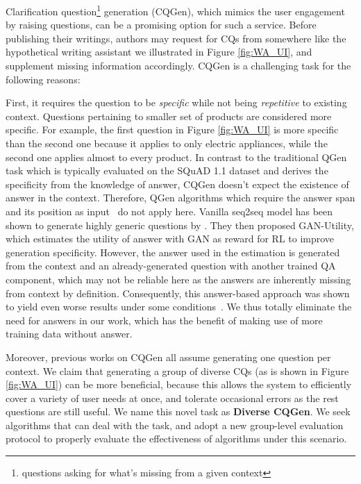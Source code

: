 Clarification question\footnote{questions asking for what's missing from a given context} generation (CQGen), which mimics the user engagement by raising questions, can be a promising option for such a service. Before publishing their writings, authors may request for CQs from somewhere like the hypothetical writing assistant we illustrated in Figure \ref{fig:WA_UI}, and supplement missing information accordingly. CQGen is a challenging task for the following reasons: 

First, it requires the question to be 
\textit{specific} while not being \textit{repetitive} to existing context. 
Questions pertaining to smaller set of products are considered more specific. 
For example, the first question in Figure \ref{fig:WA_UI} is more specific 
than the second one because it applies to only electric appliances, while
the second one applies almost to every product. 
In contrast to the traditional QGen task which is typically evaluated
on the SQuAD 1.1 dataset \citep{rajpurkar2016squad} and 
derives the specificity from the knowledge of answer, 
CQGen doesn't expect the existence of answer in the context. 
Therefore, QGen algorithms which require the answer span and its position
as input~\citep{song2018leveraging, sun2018answer,subramanian2018neural} 
do not apply here. Vanilla seq2seq model has been shown to generate 
highly generic questions by \citet{rao2019answer}. 
They then proposed GAN-Utility, which estimates the utility of answer with GAN 
as reward for RL to improve generation specificity. 
However, the answer used in the estimation is generated from the context and an already-generated 
question with another trained QA component, 
which may not be reliable here as the answers are inherently 
missing from context by definition. 
Consequently, this answer-based approach was shown to yield even worse results under 
some conditions~\citep{cao2019controlling}. We thus totally eliminate the need for answers in our work, 
which has the benefit of making use of more training data without answer.

Moreover, previous works on CQGen all assume generating one question per context. We claim that generating a group of diverse CQs 
(as is shown in Figure \ref{fig:WA_UI}) can be more beneficial, 
because this allows the system to efficiently cover a variety of user 
needs at once, and tolerate occasional errors as the rest questions are still useful. 
We name this novel task as \textbf{Diverse CQGen}. We seek algorithms that can deal with the task, and adopt a new group-level evaluation protocol to properly evaluate the effectiveness of algorithms under this scenario.

